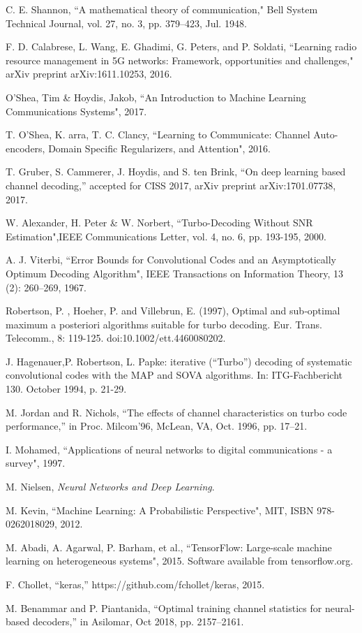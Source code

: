 \documentclass[conference]{IEEEtran}
\begin{document}
\begin{thebibliography}{00}
 C. E. Shannon, ``A mathematical theory of communication," Bell System Technical Journal, vol. 27, no. 3, pp. 379–423, Jul. 1948.


 F. D. Calabrese, L. Wang, E. Ghadimi, G. Peters, and P. Soldati, ``Learning radio resource management in 5G networks: Framework, opportunities and challenges," arXiv preprint arXiv:1611.10253, 2016.

 O'Shea, Tim \& Hoydis, Jakob, ``An Introduction to Machine Learning Communications Systems", 2017.

 T. O'Shea, K. arra, T. C. Clancy, ``Learning to Communicate: Channel Auto-encoders, Domain Specific Regularizers, and Attention", 2016.

 T. Gruber, S. Cammerer, J. Hoydis, and S. ten Brink, “On deep learning based channel decoding,” accepted for CISS 2017, arXiv preprint arXiv:1701.07738, 2017.

 W. Alexander, H. Peter \& W. Norbert, ``Turbo-Decoding Without SNR Estimation",IEEE Communications Letter, vol. 4, no. 6, pp. 193-195, 2000.

 A. J. Viterbi, ``Error Bounds for Convolutional Codes and an Asymptotically Optimum Decoding Algorithm", IEEE Transactions on Information Theory, 13 (2): 260–269, 1967.

 Robertson, P. , Hoeher, P. and Villebrun, E. (1997), Optimal and sub‐optimal maximum a posteriori algorithms suitable for turbo decoding. Eur. Trans. Telecomm., 8: 119-125. doi:10.1002/ett.4460080202.

 J. Hagenauer,P. Robertson, L. Papke: iterative (“Turbo”) decoding of systematic convolutional codes with the MAP and SOVA
algorithms. In: ITG-Fachbericht 130. October 1994, p. 21-29.

 M. Jordan and R. Nichols, “The effects of channel characteristics on turbo code performance,” in Proc. Milcom’96, McLean, VA, Oct. 1996, pp. 17–21.

 I. Mohamed, ``Applications of neural networks to digital communications - a survey", 1997.

 M. Nielsen, \textit{Neural Networks and Deep Learning}.

 M. Kevin, ``Machine Learning: A Probabilistic Perspective", MIT, ISBN 978-0262018029, 2012.

 M. Abadi, A. Agarwal, P. Barham, et al., 
``TensorFlow: Large-scale machine learning on heterogeneous systems", 2015. Software available from tensorflow.org.

 F. Chollet, “keras,” https://github.com/fchollet/keras, 2015.

 M. Benammar and P. Piantanida, “Optimal training channel statistics for neural-based decoders,” in Asilomar, Oct 2018, pp. 2157–2161.



\end{thebibliography}
\end{document}
